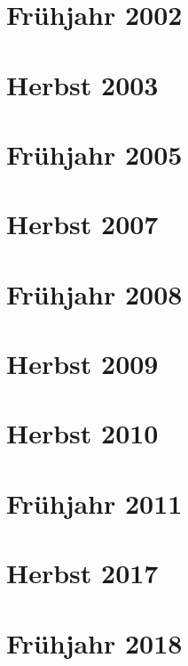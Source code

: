 \documentclass{lehramt-informatik-examen-sammlung}
\begin{document}
\section{Frühjahr 2002}


\section{Herbst 2003}


\section{Frühjahr 2005}


\section{Herbst 2007}


\section{Frühjahr 2008}


\section{Herbst 2009}


\section{Herbst 2010}


\section{Frühjahr 2011}


\section{Herbst 2017}


\section{Frühjahr 2018}

\end{document}
